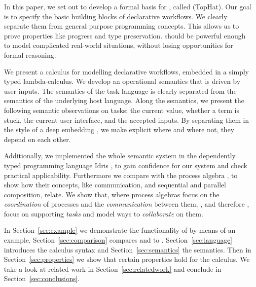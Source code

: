 
In this paper, we set out to develop a formal basis for \TOP, called \TOPHAT (TopHat).
Our goal is to specify the basic building blocks of declarative workflows.
We clearly separate them from general purpose programming concepts.
This allows us to prove properties like progress and type preservation.
\TOPHAT should be powerful enough to model complicated real-world situations,
without losing opportunities for formal reasoning.




We present a calculus for modelling declarative workflows, embedded in a simply typed lambda-calculus.
We develop an operational semantics that is driven by user inputs.
The semantics of the task language is clearly separated from the semantics of the underlying host language.
Along the semantics, we present the following semantic observations on tasks: the current value, whether a term is stuck, the current user interface, and the accepted inputs.
By separating them in the style of a deep embedding \cite{conf/cefp/Gibbons13}, we make explicit where and where not, they depend on each other.

Additionally, we implemented the whole semantic system in the dependently typed programming language Idris \cite{journals/jfp/Brady13},
to gain confidence for our system and check practical applicability.
Furthermore we compare \TOPHAT  with the process algebra \CSP, to show how their concepts, like communication, and sequential and parallel composition, relate.
We show that, where process algebras focus on the \emph{coordination} of processes and the \emph{communication} between them,
\TOP, and therefore \TOPHAT, focus on supporting \emph{tasks} and model ways to \emph{collaborate} on them.




In Section~\ref{sec:example} we demonstrate the functionality of \TOPHAT by means of an example,
Section~\ref{sec:comparison} compares \TOP and \TOPHAT to \CSP.
Section~\ref{sec:language} introduces the \TOPHAT calculus syntax
and Section~\ref{sec:semantics} the semantics.
Then in Section~\ref{sec:properties} we show that certain properties hold for the calculus.
We take a look at related work in Section~\ref{sec:relatedwork}
and conclude in Section~\ref{sec:conclusions}.
